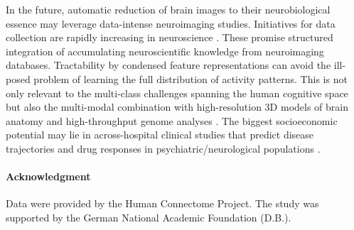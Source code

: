 \documentclass{article} %
\begin{document}
In the future, automatic reduction of brain images to
their neurobiological essence
may leverage data-intense neuroimaging studies.
Initiatives for data collection are rapidly increasing
in neuroscience \cite{poldrack2014data}.
These promise structured integration
of accumulating neuroscientific knowledge from neuroimaging databases.
Tractability by
condensed feature representations can avoid the ill-posed problem of
learning the full distribution of activity patterns.
%
This is not only relevant to the 
multi-class challenges spanning the human cognitive space
\cite{schwartz2013mapping}
but also the
multi-modal combination with
high-resolution 3D models of brain anatomy \cite{amunts2013bigbrain}
and
high-throughput genome analyses \cite{need2010gwas}.
%
The biggest socioeconomic potential may
lie in across-hospital clinical studies that
predict disease trajectories and drug responses
in psychiatric/neurological populations
\cite{frackowiak2015future, gustav2011cost}.

\paragraph{Acknowledgment}
{\small
Data were provided by the Human Connectome Project. The study was supported
by the German National Academic Foundation (D.B.).
}

\small


\end{document}
